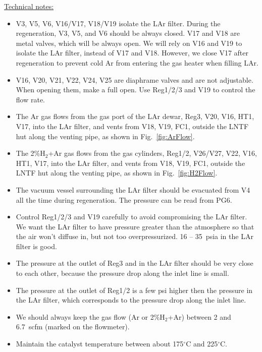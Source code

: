 \documentclass[letterpaper,11pt]{article}
\newcommand{\Hydro}     {H$_2$}
\newcommand{\dC}        {$^\circ$C}
\begin{document}
\underline{Technical notes:}
\begin{itemize}
\setlength\itemsep{-0.2em}
\item V3, V5, V6, V16/V17, V18/V19 isolate the LAr filter.  
During the regeneration, V3, V5, and V6 should be always closed.  
V17 and V18 are metal valves, which will be always open.
We will rely on V16 and V19 to 
isolate the LAr filter, instead of V17 and V18.
However, we close V17 after regeneration to prevent cold Ar from entering
the gas heater when filling LAr.
\item V16, V20, V21, V22, V24, V25 are diaphrame valves and are not adjustable.
When opening them, make a full open.
Use Reg1/2/3 and V19 to control the flow rate.
\item The Ar gas flows from the gas port of the LAr dewar, Reg3, V20, V16, HT1, V17, into the LAr filter, 
and vents from V18, V19, FC1, outside the LNTF hut along the venting pipe, as shown in 
Fig.~\ref{fig:ArFlow}.
\item The 2\%{\Hydro}+Ar gas flows from the gas cylinders, Reg1/2, V26/V27, V22, V16, HT1, V17, 
into the LAr filter, 
and vents from V18, V19, FC1, outside the LNTF hut along the venting pipe, 
as shown in Fig.~\ref{fig:H2Flow}.
\item The vacuum vessel surrounding the LAr filter should be evacuated from V4 all the time 
during regeneration.  
The pressure can be read from PG6.
\item Control Reg1/2/3 and V19 carefully to avoid compromising the LAr filter.  
We want the LAr filter to have pressure 
greater than the atmosphere so that the air won't diffuse in, but not too overpressurized.  
16 -- 35~psia in the LAr filter is good.
\item The pressure at the outlet of Reg3 and in the LAr filter should be very close to each other,
because the pressure drop along the inlet line is small.
\item The pressure at the outlet of Reg1/2 is a few psi higher then the pressure in the LAr filter,
which corresponds to the pressure drop along the inlet line. 
\item We should always keep the gas flow (Ar or 2\%{\Hydro}+Ar) between 2 and 6.7~scfm 
(marked on the flowmeter).
\item Maintain the catalyst temperature between about 175{\dC} and 225{\dC}.

\end{itemize}
\end{document}
